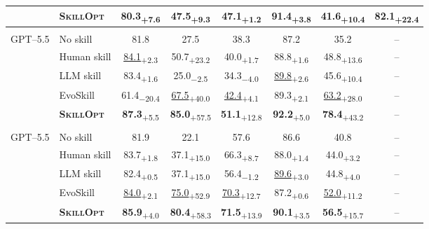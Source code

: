 \documentclass[
]{article}
\providecommand{\mrowcell}{}
\newcommand{\ourmethod}{\textsc{SkillOpt}\xspace}
\newcommand{\na}{--}
\newcommand{\dvalp}[2]{\hphantom{\textsubscript{+#2}}#1\textsubscript{\textcolor{deltapos}{+#2}}}
\newcommand{\dvaln}[2]{\hphantom{\textsubscript{$-$#2}}#1\textsubscript{\textcolor{deltaneg}{$-$#2}}}
\newcommand{\harnessrow}[1]{\rowcolor{black!7}\multicolumn{8}{l}{\textbf{#1}}}
\newcommand{\methodcell}[1]{\cellcolor{blue!8}#1}
\begin{document}
\begin{table}[!htbp]
\begin{tabular}{l l c c c c c c}
\mrowcell & \methodcell{\textbf{\ourmethod{}}} & \methodcell{\dvalp{\textbf{80.3}}{7.6}} & \methodcell{\dvalp{\textbf{47.5}}{9.3}} & \methodcell{\dvalp{\textbf{47.1}}{1.2}} & \methodcell{\dvalp{\textbf{91.4}}{3.8}} & \methodcell{\dvalp{\textbf{41.6}}{10.4}} & \methodcell{\dvalp{\textbf{82.1}}{22.4}} \\
\midrule
\harnessrow{Codex harness} \\
\multirow{5}{*}{GPT--5.5} & No skill & 81.8 & 27.5 & 38.3 & 87.2 & 35.2 & \na \\
\mrowcell & Human skill & \dvalp{\underline{84.1}}{2.3} & \dvalp{50.7}{23.2} & \dvalp{40.0}{1.7} & \dvalp{88.8}{1.6} & \dvalp{48.8}{13.6} & \na \\
\mrowcell & LLM skill & \dvalp{83.4}{1.6} & \dvaln{25.0}{2.5} & \dvaln{34.3}{4.0} & \dvalp{\underline{89.8}}{2.6} & \dvalp{45.6}{10.4} & \na \\
\mrowcell & EvoSkill & \dvaln{61.4}{20.4} & \dvalp{\underline{67.5}}{40.0} & \dvalp{\underline{42.4}}{4.1} & \dvalp{89.3}{2.1} & \dvalp{\underline{63.2}}{28.0} & \na \\
\mrowcell & \methodcell{\textbf{\ourmethod{}}} & \methodcell{\dvalp{\textbf{87.3}}{5.5}} & \methodcell{\dvalp{\textbf{85.0}}{57.5}} & \methodcell{\dvalp{\textbf{51.1}}{12.8}} & \methodcell{\dvalp{\textbf{92.2}}{5.0}} & \methodcell{\dvalp{\textbf{78.4}}{43.2}} & \methodcell{\na} \\
\midrule
\harnessrow{Claude Code harness} \\
\multirow{5}{*}{GPT--5.5} & No skill & 81.9 & 22.1 & 57.6 & 86.6 & 40.8 & \na \\
\mrowcell & Human skill & \dvalp{83.7}{1.8} & \dvalp{37.1}{15.0} & \dvalp{66.3}{8.7} & \dvalp{88.0}{1.4} & \dvalp{44.0}{3.2} & \na \\
\mrowcell & LLM skill & \dvalp{82.4}{0.5} & \dvalp{37.1}{15.0} & \dvaln{56.4}{1.2} & \dvalp{\underline{89.6}}{3.0} & \dvalp{44.8}{4.0} & \na \\
\mrowcell & EvoSkill & \dvalp{\underline{84.0}}{2.1} & \dvalp{\underline{75.0}}{52.9} & \dvalp{\underline{70.3}}{12.7} & \dvalp{87.2}{0.6} & \dvalp{\underline{52.0}}{11.2} & \na \\
\mrowcell & \methodcell{\textbf{\ourmethod{}}} & \methodcell{\dvalp{\textbf{85.9}}{4.0}} & \methodcell{\dvalp{\textbf{80.4}}{58.3}} & \methodcell{\dvalp{\textbf{71.5}}{13.9}} & \methodcell{\dvalp{\textbf{90.1}}{3.5}} & \methodcell{\dvalp{\textbf{56.5}}{15.7}} & \methodcell{\na} \\
\bottomrule
\end{tabular}

\end{table}
\end{document}
